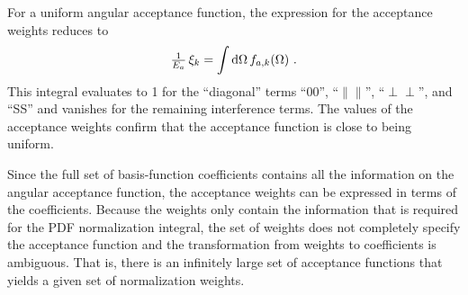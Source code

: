 For a uniform angular acceptance function, the expression for the acceptance weights reduces to
\begin{equation}
  \tfrac{1}{E_a}\, \xi_k = \int\mathrm{d}\Omega\,f_{a,k}(\Omega)\ .
\end{equation}
This integral evaluates to 1 for the ``diagonal'' terms ``00'', ``$\parallel\parallel$'', ``$\perp\perp$'', and ``SS'' and vanishes for the
remaining interference terms. The values of the acceptance weights confirm that the acceptance function is close to being uniform.

Since the full set of basis-function coefficients contains all the information on the angular acceptance function, the acceptance weights
can be expressed in terms of the coefficients. Because the weights only contain the information that is required for the PDF normalization
integral, the set of weights does not completely specify the acceptance function and the transformation from weights to coefficients is
ambiguous. That is, there is an infinitely large set of acceptance functions that yields a given set of normalization weights.


